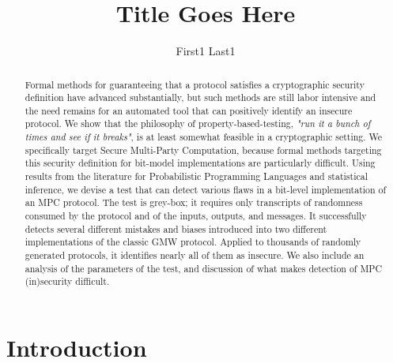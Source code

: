 \documentclass[conference]{IEEEtran}
\title{Title Goes Here}
\author{First1 Last1}
\begin{document}
\newtheorem{definition}{Definition}

\ExplSyntaxOn    %
\newcommand { \eg }
{ \textit{e.g.}
  \peek_meaning_ignore_spaces:NTF .
    { \skip_horizontal:n { -.3ex } \use_none:n }
    { \peek_meaning_ignore_spaces:NF , { \skip_horizontal:n { -.3ex } } }
}
\newcommand { \ie }
{ \textit{i.e.}
  \peek_meaning_ignore_spaces:NTF .
    { \skip_horizontal:n { -.3ex } \use_none:n }
    { \peek_meaning_ignore_spaces:NF , { \skip_horizontal:n { -.3ex } } }
}
\ExplSyntaxOff

\newcommand{\termOfArt}[1]{\textbf{#1}}


\maketitle
\thispagestyle{plain}
\pagestyle{plain}

\begin{abstract}
  Formal methods for guaranteeing that a protocol satisfies a cryptographic security definition have advanced substantially,
  but such methods are still labor intensive and the need remains for an automated tool that can positively identify an insecure protocol.
  We show that the philosophy of property-based-testing, \textit{"run it a bunch of times and see if it breaks"},
  is at least somewhat feasible in a cryptographic setting.
  We specifically target Secure Multi-Party Computation, because formal methods targeting this security definition for bit-model implementations
  are particularly difficult.
  Using results from the literature for Probabilistic Programming Languages and statistical inference, we devise a test that can
  detect various flaws in a bit-level implementation of an MPC protocol.
  The test is grey-box; it requires only transcripts of randomness consumed by the protocol and of the inputs, outputs, and messages.
  It successfully detects several different mistakes and biases introduced into two different implementations of the classic GMW protocol.
  Applied to thousands of randomly generated protocols, it identifies nearly all of them as insecure.
  We also include an analysis of the parameters of the test, and discussion of what makes detection of MPC (in)security difficult.
\end{abstract}

\section{Introduction}
\end{document}
